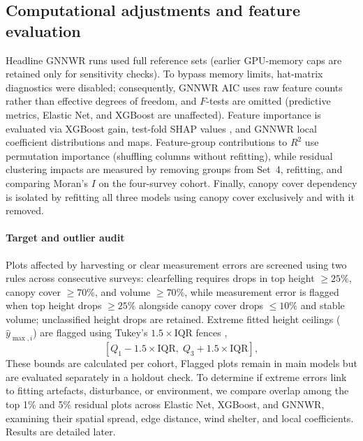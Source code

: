 \documentclass[logo,msc,ai]{infthesis}           %
\begin{document}
\subsection*{Computational adjustments and feature evaluation}
Headline GNNWR runs used full reference sets (earlier GPU-memory caps are retained only for sensitivity checks). To bypass memory limits, hat-matrix diagnostics were disabled; consequently, GNNWR AIC uses raw feature counts rather than effective degrees of freedom, and $F$-tests are omitted (predictive metrics, Elastic Net, and XGBoost are unaffected). Feature importance is evaluated via XGBoost gain, test-fold SHAP values \cite{lundberg2017Unified_C7_XAI}, and GNNWR local coefficient distributions and maps. Feature-group contributions to $R^2$ use permutation importance (shuffling columns without refitting), while residual clustering impacts are measured by removing groups from Set~4, refitting, and comparing Moran's $I$ on the four-survey cohort. Finally, canopy cover dependency is isolated by refitting all three models using canopy cover exclusively and with it removed.

\paragraph*{Target and outlier audit}
Plots affected by harvesting or clear measurement errors are screened using two rules across consecutive surveys: clearfelling requires drops in top height $\ge 25\%$, canopy cover $\ge 70\%$, and volume $\ge 70\%$, while measurement error is flagged when top height drops $\ge 25\%$ alongside canopy cover drops $\le 10\%$ and stable volume; unclassified height drops are retained. Extreme fitted height ceilings ($\hat{y}_{\max,i}$) are flagged using Tukey's $1.5 \times \text{IQR}$ fences \cite{tukey1977Exploratory_C5_EVAL},
\begin{equation}
\left[Q_1 - 1.5 \times \text{IQR},\; Q_3 + 1.5 \times \text{IQR}\right],
\label{eq:tukey-fences}
\end{equation}
These bounds are calculated per cohort, Flagged plots remain in main models but are evaluated separately in a holdout check. To determine if extreme errors link to fitting artefacts, disturbance, or environment, we compare overlap among the top 1\% and 5\% residual plots across Elastic Net, XGBoost, and GNNWR, examining their spatial spread, edge distance, wind shelter, and local coefficients. Results are detailed later.

\end{document}
